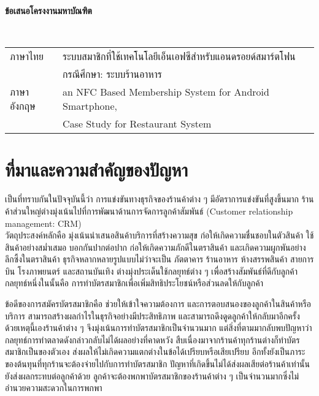 \documentclass[a4paper]{article}
\begin{document}
\clearpage

\begin{center}
{\huge \bf ข้อเสนอโครงงานมหาบัณฑิต}
\end{center}

 \\

\Large{\noindent\hspace{0.7cm}\setlength{\tabcolsep}{15pt}
\begin{tabular}{l l}    
	ภาษาไทย 		& ระบบสมาชิกที่ใช้เทคโนโลยีเอ็นเอฟซีสำหรับแอนดรอยด์สมาร์ตโฟน  \\
					& กรณีศึกษา: ระบบร้านอาหาร \\
	ภาษาอังกฤษ		& an NFC Based Membership System for Android Smartphone,  \\
					& Case Study for Restaurant System \\    
\end{tabular}
}

\section{ที่มาและความสำคัญของปัญหา}

เป็นที่ทราบกันในปัจจุบันนี้ว่า การแข่งขันทางธุรกิจของร้านค้าต่าง ๆ มีอัตราการแข่งขันที่สูงขึ้นมาก ร้านค้าส่วนใหญ่ต่างมุ่งเน้นไปที่การพัฒนาด้านการจัดการลูกค้าสัมพันธ์ (Customer relationship management: CRM) \\วัตถุประสงค์หลักคือ มุ่งเน้นนำเสนอสินค้าบริการที่สร้างความสุข ก่อให้เกิดความชื่นชอบในตัวสินค้า ใช้สินค้าอย่างสม่ำเสมอ บอกกันปากต่อปาก ก่อให้เกิดความภักดีในตราสินค้า และเกิดความผูกพันอย่างลึกซึ้งในตราสินค้า ธุรกิจหลากหลายรูปแบบไม่ว่าจะเป็น ภัตตาคาร ร้านอาหาร ห้างสรรพสินค้า สายการบิน โรงภาพยนตร์ และสถานบันเทิง ต่างมุ่งประเด็นใช้กลยุทธ์ต่าง ๆ เพื่อสร้างสัมพันธ์ที่ดีกับลูกค้า กลยุทธ์หนึ่งในนั้นคือ การทำบัตรสมาชิกเพื่อเพิ่มสิทธิประโยชน์หรือส่วนลดให้กับลูกค้า

ข้อดีของการสมัครบัตรสมาชิกคือ ช่วยให้เข้าใจความต้องการ และการตอบสนองของลูกค้าในสินค้าหรือบริการ สามารถสร้างผลกําไรในธุรกิจอย่างมีประสิทธิภาพ และสามารถดึงดูดลูกค้าให้กลับมาอีกครั้ง ด้วยเหตุนี้เองร้านค้าต่าง ๆ จึงมุ่งเน้นการทำบัตรสมาชิกเป็นจำนวนมาก แต่สิ่งที่ตามมากลับพบปัญหาว่ากลยุทธ์การทำตลาดดังกล่าวกลับไม่ได้ผลอย่างที่คาดหวัง สืบเนื่องมาจากร้านค้าทุกร้านต่างก็ทำบัตรสมาชิกเป็นของตัวเอง ส่งผลให้ไม่เกิดความแตกต่างในข้อได้เปรียบหรือเสียเปรียบ อีกทั้งยังเป็นภาระของต้นทุนที่ทุกร้านจะต้องจ่ายไปกับการทำบัตรสมาชิก ปัญหาที่เกิดขึ้นไม่ได้ส่งผลเสียต่อร้านค้าเท่านั้น  ยังส่งผลกระทบต่อลูกค้าด้วย ลูกค้าจะต้องพกพาบัตรสมาชิกของร้านค้าต่าง ๆ เป็นจำนวนมากซึ่งไม่อำนวยความสะดวกในการพกพา
\end{document}
